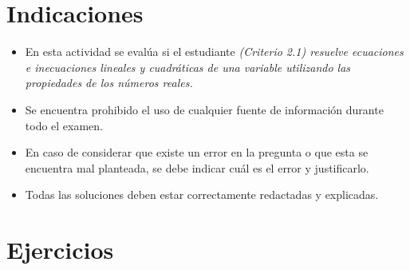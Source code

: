 \documentclass[11pt,a4]{aleph-examen}
\begin{document}
\encabezado

\section*{Indicaciones}
\begin{itemize}[leftmargin=*]
\item 
    En esta actividad se evalúa si el estudiante \textit{(Criterio 2.1) resuelve ecuaciones e inecuaciones lineales y cuadráticas de una variable utilizando las propiedades de los números reales.} 
\item
    Se encuentra prohibido el uso de cualquier fuente de información durante todo el examen.
\item
    En caso de considerar que existe un error en la pregunta o que esta se encuentra mal planteada, se debe indicar cuál es el error y justificarlo.
\item
    Todas las soluciones deben estar correctamente redactadas y explicadas.
\end{itemize}

\section*{Ejercicios}
\end{document}

